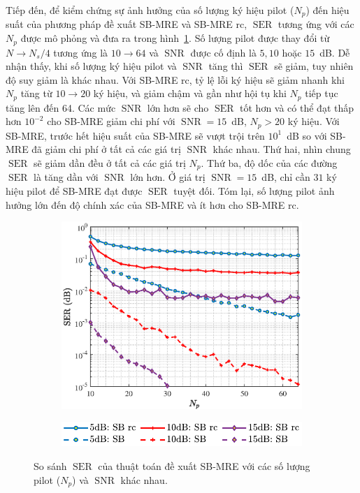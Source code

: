 Tiếp đến, để kiểm chứng sự ảnh hưởng của số lượng ký hiệu pilot ($N_p$) đến hiệu suất của phương pháp đề xuất SB-MRE và SB-MRE rc, $\operatorname{SER}$ tương ứng với các $N_p$ được mô phỏng và đưa ra trong hình~\ref{fig:vary_N_p}. Số lượng pilot được thay đổi từ $N \rightarrow N_s/4$ tương ứng là $10\rightarrow 64$ và $\operatorname{SNR}$ được cố định là $5, 10$ hoặc $15$~dB. Dễ nhận thấy, khi số lượng ký hiệu pilot và $\operatorname{SNR}$ tăng thì $\operatorname{SER}$ sẽ giảm, tuy nhiên độ suy giảm là khác nhau. Với SB-MRE rc, tỷ lệ lỗi ký hiệu sẽ giảm nhanh khi $N_p$ tăng từ $10 \rightarrow 20$ ký hiệu, và giảm chậm và gần như hội tụ khi $N_p$ tiếp tục tăng lên đến 64. Các mức $\operatorname{SNR}$ lớn hơn sẽ cho $\operatorname{SER}$ tốt hơn và có thể đạt thấp hơn $10^{-2}$ cho SB-MRE giảm chi phí với $\operatorname{SNR}=15$~dB, $N_p > 20$ ký hiệu. Với SB-MRE, trước hết hiệu suất của SB-MRE sẽ vượt trội trên $10^1$~dB so với SB-MRE đã giảm chi phí ở tất cả các giá trị $\operatorname{SNR}$ khác nhau. Thứ hai, nhìn chung $\operatorname{SER}$ sẽ giảm dần đều ở tất cả các giá trị $N_p$. Thứ ba, độ dốc của các đường $\operatorname{SER}$ là tăng dần với $\operatorname{SNR}$ lớn hơn. Ở giá trị $\operatorname{SNR}=15$~dB, chỉ cần $31$ ký hiệu pilot để SB-MRE đạt được $\operatorname{SER}$ tuyệt đối. Tóm lại, số lượng pilot ảnh hưởng lớn đến độ chính xác của SB-MRE và ít hơn cho SB-MRE rc.
\begin{figure}[ht]
    \centering
    \begin{subfigure}
         \centering
         \includegraphics[width=0.8\linewidth]{figures/vary_N_p_1.eps}
     \end{subfigure}
     \hfill
     \begin{subfigure}
         \centering
         \includegraphics[width=.6\linewidth]{figures/legend.pdf}
     \end{subfigure}
     \hfill
    \caption{So sánh $\operatorname{SER}$ của thuật toán đề xuất SB-MRE với các số lượng pilot ($N_p$) và $\operatorname{SNR}$ khác nhau.}
    \label{fig:vary_N_p}
\end{figure}


